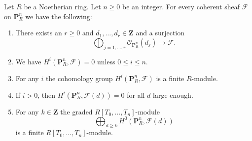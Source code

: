 \begin{lemma}
\label{lemma-coherent-projective}
Let $R$ be a Noetherian ring.
Let $n \geq 0$ be an integer.
For every coherent sheaf $\mathcal{F}$ on $\mathbf{P}^n_R$
we have the following:
\begin{enumerate}
\item There exists an $r \geq 0$ and
$d_1, \ldots, d_r \in \mathbf{Z}$ and a surjection
$$
\bigoplus\nolimits_{j = 1, \ldots, r}
\mathcal{O}_{\mathbf{P}^n_R}(d_j)
\longrightarrow
\mathcal{F}.
$$
\item We have $H^i(\mathbf{P}^n_R, \mathcal{F}) = 0$ unless
$0 \leq i \leq n$.
\item For any $i$ the cohomology group $H^i(\mathbf{P}^n_R, \mathcal{F})$
is a finite $R$-module.
\item If $i > 0$, then
$H^i(\mathbf{P}^n_R, \mathcal{F}(d)) = 0$ for all $d$ large enough.
\item For any $k \in \mathbf{Z}$ the graded $R[T_0, \ldots, T_n]$-module
$$
\bigoplus\nolimits_{d \geq k} H^0(\mathbf{P}^n_R, \mathcal{F}(d))
$$
is a finite $R[T_0, \ldots, T_n]$-module.
\end{enumerate}
\end{lemma}

